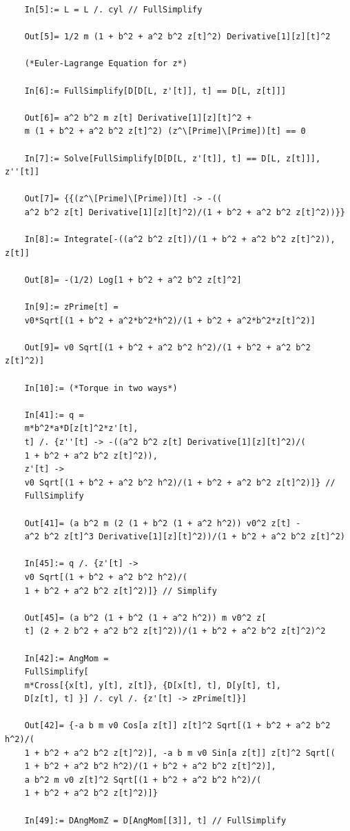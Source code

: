 \documentclass{article}
\theoremstyle{definition}
\begin{document}
\begin{enumerate}[label = (\alph*)]
\begin{lstlisting}
	In[5]:= L = L /. cyl // FullSimplify
	
	Out[5]= 1/2 m (1 + b^2 + a^2 b^2 z[t]^2) Derivative[1][z][t]^2
	
	(*Euler-Lagrange Equation for z*)
	
	In[6]:= FullSimplify[D[D[L, z'[t]], t] == D[L, z[t]]]
	
	Out[6]= a^2 b^2 m z[t] Derivative[1][z][t]^2 + 
	m (1 + b^2 + a^2 b^2 z[t]^2) (z^\[Prime]\[Prime])[t] == 0
	
	In[7]:= Solve[FullSimplify[D[D[L, z'[t]], t] == D[L, z[t]]], z''[t]]
	
	Out[7]= {{(z^\[Prime]\[Prime])[t] -> -((
	a^2 b^2 z[t] Derivative[1][z][t]^2)/(1 + b^2 + a^2 b^2 z[t]^2))}}
	
	In[8]:= Integrate[-((a^2 b^2 z[t])/(1 + b^2 + a^2 b^2 z[t]^2)), z[t]]
	
	Out[8]= -(1/2) Log[1 + b^2 + a^2 b^2 z[t]^2]
	
	In[9]:= zPrime[t] = 
	v0*Sqrt[(1 + b^2 + a^2*b^2*h^2)/(1 + b^2 + a^2*b^2*z[t]^2)]
	
	Out[9]= v0 Sqrt[(1 + b^2 + a^2 b^2 h^2)/(1 + b^2 + a^2 b^2 z[t]^2)]
	
	In[10]:= (*Torque in two ways*)
	
	In[41]:= q = 
	m*b^2*a*D[z[t]^2*z'[t], 
	t] /. {z''[t] -> -((a^2 b^2 z[t] Derivative[1][z][t]^2)/(
	1 + b^2 + a^2 b^2 z[t]^2)), 
	z'[t] -> 
	v0 Sqrt[(1 + b^2 + a^2 b^2 h^2)/(1 + b^2 + a^2 b^2 z[t]^2)]} // 
	FullSimplify
	
	Out[41]= (a b^2 m (2 (1 + b^2 (1 + a^2 h^2)) v0^2 z[t] - 
	a^2 b^2 z[t]^3 Derivative[1][z][t]^2))/(1 + b^2 + a^2 b^2 z[t]^2)
	
	In[45]:= q /. {z'[t] -> 
	v0 Sqrt[(1 + b^2 + a^2 b^2 h^2)/(
	1 + b^2 + a^2 b^2 z[t]^2)]} // Simplify
	
	Out[45]= (a b^2 (1 + b^2 (1 + a^2 h^2)) m v0^2 z[
	t] (2 + 2 b^2 + a^2 b^2 z[t]^2))/(1 + b^2 + a^2 b^2 z[t]^2)^2
	
	In[42]:= AngMom = 
	FullSimplify[
	m*Cross[{x[t], y[t], z[t]}, {D[x[t], t], D[y[t], t], 
	D[z[t], t] }] /. cyl /. {z'[t] -> zPrime[t]}]
	
	Out[42]= {-a b m v0 Cos[a z[t]] z[t]^2 Sqrt[(1 + b^2 + a^2 b^2 h^2)/(
	1 + b^2 + a^2 b^2 z[t]^2)], -a b m v0 Sin[a z[t]] z[t]^2 Sqrt[(
	1 + b^2 + a^2 b^2 h^2)/(1 + b^2 + a^2 b^2 z[t]^2)], 
	a b^2 m v0 z[t]^2 Sqrt[(1 + b^2 + a^2 b^2 h^2)/(
	1 + b^2 + a^2 b^2 z[t]^2)]}
	
	In[49]:= DAngMomZ = D[AngMom[[3]], t] // FullSimplify
	

\end{lstlisting}
\end{enumerate}
\end{document}
